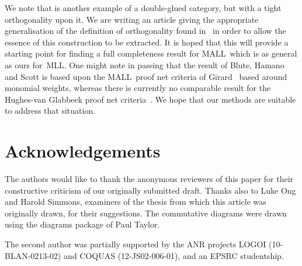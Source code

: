 \documentclass{LMCS}
\theoremstyle{plain}\newtheorem*{cLm}{Claim}
\newcommand{\mll}{MLL} \newcommand{\mall}{MALL}
\newcommand{\p}{} \newcommand{\N}{\mathbb{N}}
\newcommand{\hughe}[1]{#1}
\newcommand{\hughf}[1]{#1}
\begin{document}
\p We note that  is another example of a double-glued
category, but with a tight orthogonality upon it. \hughf{We are writing an article giving the appropriate generalisation of the definition of orthogonality found in~\cite{HS03} in order to allow the essence of this construction to be extracted. It is hoped that this will provide a starting point for finding a full completeness result for \mall\ which is as general as ours for~\mll.} One might note in
passing that the result of Blute, Hamano and Scott is based upon the
\mall~proof net criteria of Girard~\cite{Gir96} based around monomial weights, whereas there is currently no comparable result for the Hughes-van Glabbeek proof net criteria~\cite{HvG05}. We hope that our methods are suitable to address that situation.

\section*{Acknowledgements}
  \hughe{The authors would like to thank the anonymous reviewers of this paper for their constructive criticism of our originally submitted draft. Thanks also to Luke Ong and Harold Simmons, examiners of the thesis from which this article was originally drawn, for their suggestions. The commutative diagrams were drawn using the diagrams package of Paul Taylor.
  
  \noindent The second author was partially supported by the ANR projects LOGOI (10-BLAN-0213-02) and COQUAS (12-JS02-006-01), and an EPSRC studentship.}
\end{document}
